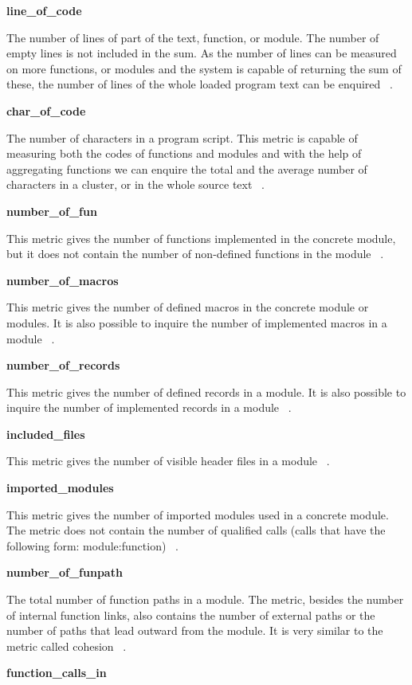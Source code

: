 \textbf{line\_of\_code}

The number of lines of part of the text, function, or module. The number of empty lines is not included in the sum. As the number of lines can be measured on more functions, or modules and the system is capable of returning the sum of these, the number of lines of the whole loaded program text can be enquired ~\cite{refactorerlm}.

\textbf{char\_of\_code}

The number of characters in a program script. This metric is capable of measuring both the codes of functions and modules and with the help of aggregating functions we can enquire the total and the average number of characters in a cluster, or in the whole source text ~\cite{refactorerlm}.

\textbf{number\_of\_fun}

This metric gives the number of functions implemented in the concrete module, but it does not contain the number of non-defined functions in the module~ \cite{refactorerlm}.

\textbf{number\_of\_macros}

This metric gives the number of defined macros in the concrete module or modules. It is also possible to inquire the number of implemented macros in a module ~\cite{refactorerlm}.

\textbf{number\_of\_records}

 This metric gives the number of defined records in a module. It is also possible to inquire the number of implemented records in a module ~\cite{refactorerlm}.

\textbf{included\_files}

This metric gives the number of visible header files in a module ~\cite{refactorerlm}.

\textbf{imported\_modules}

This metric gives the number of imported modules used in a concrete module. The metric does not contain the number of qualified calls (calls that have the following form: module:function) ~\cite{refactorerlm}.

\textbf{number\_of\_funpath}

The total number of function paths in a module. The metric, besides the number of internal function links, also contains the number of external paths or the number of paths that lead outward from the module. It is very similar to the metric called cohesion ~\cite{refactorerlm}.

\textbf{function\_calls\_in}

